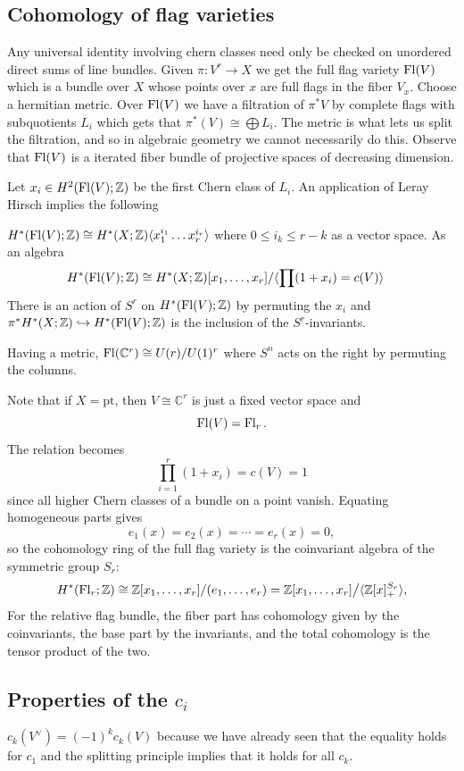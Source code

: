 \documentclass[12pt]{article}
\begin{document}
\subsection{Cohomology of flag varieties}
Any universal identity involving chern classes need only be checked on unordered direct sums of line bundles. Given $\pi:V^r\to X$ we get the full flag variety $\operatorname{Fl}(V)$ which is a bundle over $X$ whose points over $x$ are full flags in the fiber $V_x$. Choose a hermitian metric. Over $\operatorname{Fl}(V)$ we have a filtration of $\pi^*V$ by complete flags with subquotients $L_i$ which gets that $\pi^*(V) \cong \bigoplus L_i$. The metric is what lets us split the filtration, and so in algebraic geometry we cannot necessarily do this. Observe that $\operatorname{Fl}(V)$ is a iterated fiber bundle of projective spaces of decreasing dimension.

Let $x_i \in H^2(\operatorname{Fl}(V); \mathbb{Z})$ be the first Chern class of $L_i$. An application of Leray Hirsch implies the following \begin{theorem}
    $H^*(\operatorname{Fl}(V); \mathbb{Z}) \cong H^*(X; \mathbb{Z})\langle x_1^{i_1}\dots x_r^{i_r} \rangle$ where $0\leq i_k \leq r-k$ as a vector space. As an algebra \begin{align*}
        H^*(\operatorname{Fl}(V); \mathbb{Z}) &\cong H^*(X; \mathbb{Z})[x_1,\dots, x_r]/\langle \prod(1 + x_i) = c(V) \rangle
    \end{align*}
    There is an action of $S^r$ on $H^*(\operatorname{Fl}(V); \mathbb{Z})$ by permuting the $x_i$ and $\pi^* H^*(X; \mathbb{Z}) \hookrightarrow H^*(\operatorname{Fl}(V); \mathbb{Z})$ is the inclusion of the $S^r$-invariants. 
\end{theorem}

Having a metric, $\operatorname{Fl}(\mathbb{C}^r) \cong U(r)/U(1)^r$ where $S^n$ acts on the right by permuting the columns.

Note that if $X=\mathrm{pt}$, then $V\cong \mathbb{C}^r$ is just a fixed vector space and
\[
\operatorname{Fl}(V)=\operatorname{Fl}_r.
\] The relation becomes
\[
\prod_{i=1}^r (1+x_i)=c(V)=1
\]
since all higher Chern classes of a bundle on a point vanish. Equating homogeneous parts gives
\[
e_1(x)=e_2(x)=\cdots=e_r(x)=0,
\]
so the cohomology ring of the full flag variety is the coinvariant algebra of the symmetric group $S_r$:
\[
H^*(\operatorname{Fl}_r;\mathbb{Z})\cong \mathbb{Z}[x_1,\dots,x_r]/(e_1,\dots,e_r)
= \mathbb{Z}[x_1,\dots,x_r]\big/\langle \mathbb{Z}[x]^{S_r}_+\rangle,
\]
	For the relative flag bundle, the fiber part has cohomology given by the coinvariants, the base part by the invariants, and the total cohomology is the tensor product of the two. 

\subsection{Properties of the $c_i$}
$c_k(V^\vee) = (-1)^k c_k(V)$ because we have already seen that the equality holds for $c_1$ and the splitting principle implies that it holds for all $c_k$.
\end{document}
